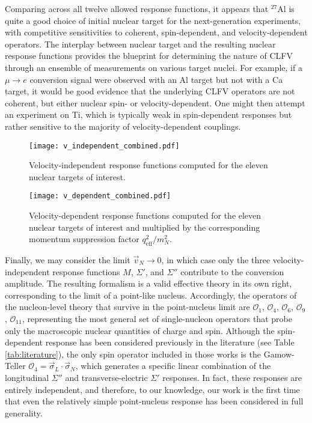 \documentclass{book}[letterpaper,12pt]
\begin{document}
Comparing across all twelve allowed response functions, it appears that $^{27}$Al is quite a good choice of initial nuclear target for the next-generation experiments, with competitive sensitivities to coherent, spin-dependent, and velocity-dependent operators. The interplay between nuclear target and the resulting nuclear response functions provides the blueprint for determining the nature of CLFV through an ensemble of measurements on various target nuclei. For example, if a $\mu\rightarrow e$ conversion signal were observed with an Al target but not with a Ca target, it would be good evidence that the underlying CLFV operators are not coherent, but either nuclear spin- or velocity-dependent. One might then attempt an experiment on Ti, which is typically weak in spin-dependent responses but rather sensitive to the majority of velocity-dependent couplings.
\begin{figure}
\centering
\texttt{[image: v\_independent\_combined.pdf]}
\caption{Velocity-independent response functions computed for the eleven nuclear targets of interest.}
\label{fig:v_ind_responses}
\end{figure}
\begin{figure}
\centering
\texttt{[image: v\_dependent\_combined.pdf]}
\caption{Velocity-dependent response functions computed for the eleven nuclear targets of interest and multiplied by the corresponding momentum suppression factor $q_\mathrm{eff}^2/m_N^2$.}
\label{fig:v_dep_responses}
\end{figure}

Finally, we may consider the limit $\vec{v}_N\rightarrow 0$, in which case only the three velocity-independent response functions $M$, $\Sigma'$, and $\Sigma''$ contribute to the conversion amplitude. The resulting formalism is a valid effective theory in its own right, corresponding to the limit of a point-like nucleus. Accordingly, the operators of the nucleon-level theory that survive in the point-nucleus limit are $\mathcal{O}_1$, $\mathcal{O}_4$, $\mathcal{O}_6$, $\mathcal{O}_9$, $\mathcal{O}_{11}$, representing the most general set of single-nucleon operators that probe only the macroscopic nuclear quantities of charge and spin. Although the spin-dependent response has been considered previously in the literature (see Table \ref{tab:literature}), the only spin operator included in those works is the Gamow-Teller $\mathcal{O}_4=\vec{\sigma}_L\cdot\vec{\sigma}_N$, which generates a specific linear combination of the longitudinal $\Sigma''$ and transverse-electric $\Sigma'$ responses. In fact, these responses are entirely independent, and therefore, to our knowledge, our work is the first time that even the relatively simple point-nucleus response has been considered in full generality.
\end{document}
